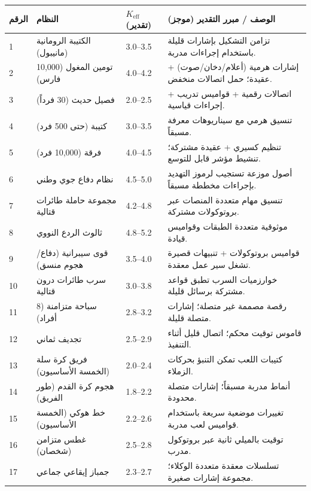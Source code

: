 \documentclass[13pt,a4paper]{article}
\begin{document}
	\begin{longtable}{|p{0.8cm}|p{6.2cm}|p{3.0cm}|p{5.7cm}|}
		\hline
		\textbf{الرقم} & \textbf{النظام} & \textbf{$K_{\mathrm{eff}}$ (تقدير)} & \textbf{الوصف / مبرر التقدير (موجز)} \\
		\hline
		\endhead
		1 & الكتيبة الرومانية (مانيبول) & 3.0--3.5 & تزامن التشكيل بإشارات قليلة باستخدام إجراءات مدربة. \\
		\hline
		2 & تومين المغول (10,000 فارس) & 4.0--4.2 & إشارات هرمية (أعلام/دخان/صوت) + عقيدة؛ حمل اتصالات منخفض. \\
		\hline
		3 & فصيل حديث (30 فرداً) & 2.0--2.5 & اتصالات رقمية + قواميس تدريب + إجراءات قياسية. \\
		\hline
		4 & كتيبة (حتى 500 فرد) & 3.0--3.5 & تنسيق هرمي مع سيناريوهات معرفة مسبقاً. \\
		\hline
		5 & فرقة (10,000 فرد) & 4.0--4.5 & تنظيم كسيري + عقيدة مشتركة؛ تنشيط مؤشر قابل للتوسع. \\
		\hline
		6 & نظام دفاع جوي وطني & 4.5--5.0 & أصول موزعة تستجيب لرموز التهديد بإجراءات مخططة مسبقاً. \\
		\hline
		7 & مجموعة حاملة طائرات قتالية & 4.2--4.8 & تنسيق مهام متعددة المنصات عبر بروتوكولات مشتركة. \\
		\hline
		8 & ثالوث الردع النووي & 4.8--5.2 & موثوقية متعددة الطبقات وقواميس قيادة. \\
		\hline
		9 & قوى سيبرانية (دفاع/هجوم منسق) & 3.5--4.0 & قواميس بروتوكولات + تنبيهات قصيرة تشغل سير عمل معقدة. \\
		\hline
		10 & سرب طائرات درون قتالية & 3.0--3.8 & خوارزميات السرب تطبق قواعد مشتركة برسائل قليلة. \\
		\hline
		11 & سباحة متزامنة (8 أفراد) & 2.8--3.2 & رقصة مصممة غير متصلة؛ إشارات متصلة قليلة. \\
		\hline
		12 & تجديف ثماني & 2.5--2.9 & قاموس توقيت محكم؛ اتصال قليل أثناء التنفيذ. \\
		\hline
		13 & فريق كرة سلة (الخمسة الأساسيون) & 2.0--2.4 & كتيبات اللعب تمكن التنبؤ بحركات الزملاء. \\
		\hline
		14 & هجوم كرة القدم (طور الفريق) & 1.8--2.2 & أنماط مدربة مسبقاً؛ إشارات متصلة محدودة. \\
		\hline
		15 & خط هوكي (الخمسة الأساسيون) & 2.2--2.6 & تغييرات موضعية سريعة باستخدام قواميس لعب مدربة. \\
		\hline
		16 & غطس متزامن (شخصان) & 2.5--2.8 & توقيت بالميلي ثانية عبر بروتوكول مدرب. \\
		\hline
		17 & جمباز إيقاعي جماعي & 2.3--2.7 & تسلسلات معقدة متعددة الوكلاء؛ مجموعة إشارات صغيرة. \\

\end{longtable}
\end{document}
